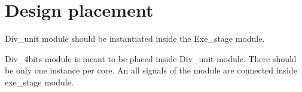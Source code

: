\section{Design placement}
\label{chapter2}

Div\_unit module should be instantiated inside the Exe\_stage module.

Div\_4bits module is meant to be placed inside Div\_unit module. There should be only one instance per core. An all signals of the module are connected inside exe\_stage module.
